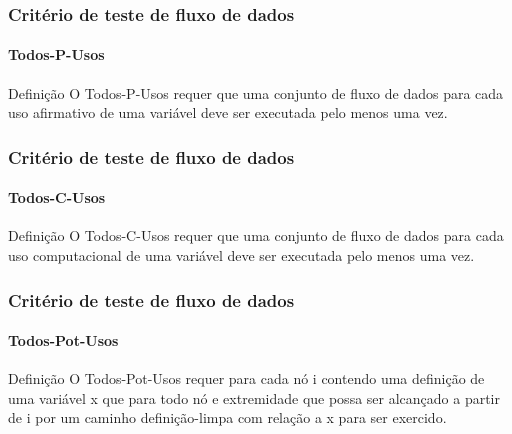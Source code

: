 \begin{frame}
\label{concept:all-p-uses}
\label{concept:all-p-uses-criterion}
\frametitle{Critério de teste de fluxo de dados}
\framesubtitle{Todos-P-Usos}

\begin{block:concept}{Definição}
O Todos-P-Usos requer que uma conjunto de fluxo de dados para cada uso
afirmativo de uma variável deve ser executada pelo menos uma vez.
\end{block:concept}
\end{frame}



\begin{frame}
\label{concept:all-c-uses}
\label{concept:all-c-uses-criterion}
\frametitle{Critério de teste de fluxo de dados}
\framesubtitle{Todos-C-Usos}

\begin{block:concept}{Definição}
O Todos-C-Usos requer que uma conjunto de fluxo de dados para cada uso
computacional de uma variável deve ser executada pelo menos uma vez.
\end{block:concept}
\end{frame}



\begin{frame}[hasnext=false]
\label{concept:all-pot-uses}
\label{concept:all-pot-uses-criterion}
\frametitle{Critério de teste de fluxo de dados}
\framesubtitle{Todos-Pot-Usos}

\begin{block:concept}{Definição}
O Todos-Pot-Usos requer para cada nó i contendo uma definição de
uma variável x que para todo nó e extremidade que possa ser alcançado a partir de i por um
caminho definição-limpa com relação a x para ser exercido.
\end{block:concept}

\hfill
{}
\end{frame}